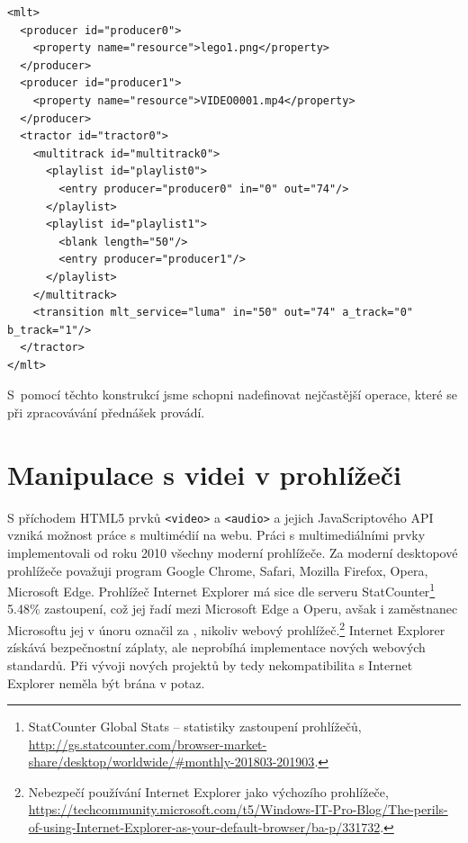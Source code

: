 \begin{lstlisting}[style=xml]
<mlt>
  <producer id="producer0">
    <property name="resource">lego1.png</property>
  </producer>
  <producer id="producer1">
    <property name="resource">VIDEO0001.mp4</property>
  </producer>
  <tractor id="tractor0">
    <multitrack id="multitrack0">
      <playlist id="playlist0">
        <entry producer="producer0" in="0" out="74"/>
      </playlist>
      <playlist id="playlist1">
        <blank length="50"/>
        <entry producer="producer1"/>
      </playlist>
    </multitrack>
    <transition mlt_service="luma" in="50" out="74" a_track="0" b_track="1"/>
  </tractor>
</mlt>
\end{lstlisting}

S~pomocí těchto konstrukcí jsme schopni nadefinovat nejčastější operace, které se při zpracovávání přednášek provádí.

\section{Manipulace s videi v prohlížeči}
S příchodem HTML5 prvků \texttt{<video>} a \texttt{<audio>} a jejich JavaScriptového API vzniká možnost práce s multimédií na webu. Práci s multimediálními prvky implementovali od roku 2010 všechny moderní prohlížeče. Za moderní desktopové prohlížeče považuji program Google Chrome, Safari, Mozilla Firefox, Opera, Microsoft Edge. Prohlížeč Internet Explorer má sice dle serveru StatCounter\footnote{StatCounter Global Stats -- statistiky zastoupení prohlížečů, \url{http://gs.statcounter.com/browser-market-share/desktop/worldwide/#monthly-201803-201903}.} 5.48\% zastoupení, což jej řadí mezi Microsoft Edge a Operu, avšak i zaměstnanec Microsoftu jej v únoru označil za , nikoliv webový prohlížeč.\footnote{Nebezpečí používání Internet Explorer jako výchozího prohlížeče, \url{https://techcommunity.microsoft.com/t5/Windows-IT-Pro-Blog/The-perils-of-using-Internet-Explorer-as-your-default-browser/ba-p/331732}.} Internet Explorer získává bezpečnostní záplaty, ale neprobíhá implementace nových webových standardů. Při vývoji nových projektů by tedy nekompatibilita s Internet Explorer neměla být brána v potaz.

